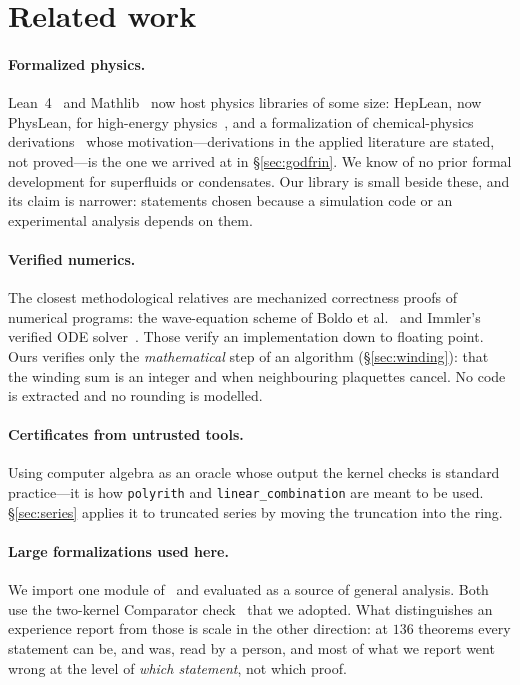 \documentclass[11pt,a4paper]{article}
\theoremstyle{definition}
\newcommand{\lean}[1]{\texttt{\small #1}}
\begin{document}
\section{Related work}
\label{sec:related}

\paragraph{Formalized physics.} Lean~4~\cite{Lean4} and Mathlib~\cite{Mathlib} now host physics
libraries of some size: HepLean, now PhysLean, for high-energy physics~\cite{HepLean}, and a
formalization of chemical-physics derivations~\cite{Bobbin2024} whose motivation---derivations in the
applied literature are stated, not proved---is the one we arrived at in \S\ref{sec:godfrin}. We know of
no prior formal development for superfluids or condensates. Our library is small beside these, and its
claim is narrower: statements chosen because a simulation code or an experimental analysis depends on
them.

\paragraph{Verified numerics.} The closest methodological relatives are mechanized correctness proofs of
numerical programs: the wave-equation scheme of Boldo et al.~\cite{Boldo2013} and Immler's verified ODE
solver~\cite{Immler2018}. Those verify an implementation down to floating point. Ours verifies only the
\emph{mathematical} step of an algorithm (\S\ref{sec:winding}): that the winding sum is an integer and
when neighbouring plaquettes cancel. No code is extracted and no rounding is modelled.

\paragraph{Certificates from untrusted tools.} Using computer algebra as an oracle whose output the
kernel checks is standard practice---it is how \lean{polyrith} and \lean{linear\_combination} are meant
to be used. \S\ref{sec:series} applies it to truncated series by moving the truncation into the ring.

\paragraph{Large formalizations used here.} We import one module of~\cite{OpenAINSE} and evaluated
\cite{AnthropicFLT} as a source of general analysis. Both use the two-kernel Comparator
check~\cite{Comparator} that we adopted. What distinguishes an experience report from those is scale
in the other direction: at $136$ theorems every statement can be, and was, read by a person, and most of
what we report went wrong at the level of \emph{which statement}, not which proof.
\end{document}
